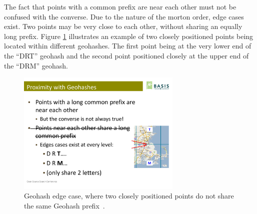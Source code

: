The fact that points with a common prefix are near each other must not be confused with the converse. Due to the nature of the morton order, edge cases exist. Two points may be very close to each other, without sharing an equally long prefix. Figure \ref{fig:geohash-edge} illustrates an example of two closely positioned points being located within different geohashes. The first point being at the very lower end of the ``DRT'' geohash and the second point positioned closely at the upper end of the ``DRM'' geohash. 

\begin{figure}[h]
  \begin{center}
    \includegraphics[width=0.7\textwidth]{figures/geohash_edges.pdf}
    \caption{Geohash edge case, where two closely positioned points do not share the same Geohash prefix~\cite{Smiley11geohash}.}
    \label{fig:geohash-edge}
  \end{center}
\end{figure}



























